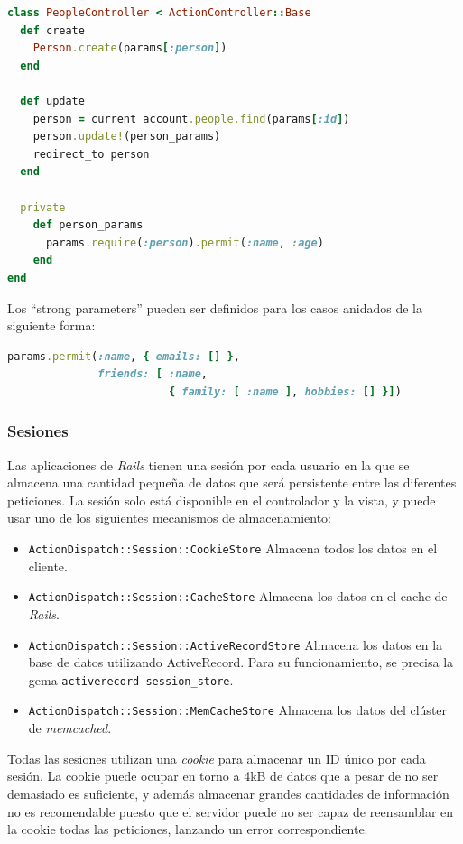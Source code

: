 \begin{description}
\begin{lstlisting}[language=Ruby]
class PeopleController < ActionController::Base
  def create
    Person.create(params[:person])
  end
 
  def update
    person = current_account.people.find(params[:id])
    person.update!(person_params)
    redirect_to person
  end
 
  private
    def person_params
      params.require(:person).permit(:name, :age)
    end
end
\end{lstlisting}
	
	Los ``strong parameters'' pueden ser definidos para los casos anidados de la siguiente forma:
	
\begin{lstlisting}[language=Ruby]
params.permit(:name, { emails: [] },
              friends: [ :name,
                         { family: [ :name ], hobbies: [] }])
\end{lstlisting}		 

\end{description}
 

\subsubsection{Sesiones}
Las aplicaciones de \textit{Rails} tienen una sesión por cada usuario en la que se almacena una cantidad pequeña de datos que será persistente entre las diferentes peticiones. La sesión solo está disponible en el controlador y la vista, y puede usar uno de los siguientes mecanismos de almacenamiento:

\begin{itemize}
	\item \texttt{ActionDispatch::Session::CookieStore} Almacena todos los datos en el cliente.
	\item \texttt{ActionDispatch::Session::CacheStore} Almacena los datos en el cache de \textit{Rails}.
	\item \texttt{ActionDispatch::Session::ActiveRecordStore} Almacena los datos en la base de datos utilizando ActiveRecord. Para su funcionamiento, se precisa la gema \texttt{activerecord-session\_store}.
	\item \texttt{ActionDispatch::Session::MemCacheStore} Almacena los datos del clúster de \textit{memcached}.
\end{itemize}

Todas las sesiones utilizan una \textit{cookie} para almacenar un ID único por cada sesión. La cookie puede ocupar en torno a 4kB de datos que a pesar de no ser demasiado es suficiente, y además almacenar grandes cantidades de información no es recomendable puesto que el servidor puede no ser capaz de reensamblar en la cookie todas las peticiones, lanzando un error correspondiente.

